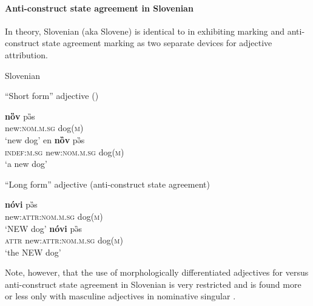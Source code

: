 \paragraph*{Anti\hyp{}construct state agreement in Slovenian}\label{slovenian synchr}
In theory, Slovenian (aka Slovene) is identical to  in exhibiting  marking and anti\hyp{}construct state agreement marking as two separate devices for adjective attribution.
\begin{exe}
\label{slov longshort}
\ex \rm{Slovenian \citep[410]{priestly1993}}
\begin{xlist}
\ex \rm{“Short form” adjective ()}
\begin{xlist}
\ex
\gll 	\textbf{nȍv} pə̏s\\
	new:\textsc{nom.m.sg} dog\textsc{(m)}\\
\glt	‘new dog’
\ex	
\gll	en \textbf{nȍv} pə̏s\\
	\textsc{indef:m.sg} new:\textsc{nom.m.sg} dog\textsc{(m)}\\
\glt	‘a new dog’
\end{xlist}
\ex \rm{“Long form” adjective (anti\hyp{}construct state agreement)}
\begin{xlist}
\ex	
\gll	\textbf{nóvi} pə̏s\\
	new:\textsc{attr:nom.m.sg} dog\textsc{(m)}\\
\glt	‘NEW dog’
\ex
{} \textbf{nóvi} pə̏s\\
	{\textsc{attr}} new:\textsc{attr:nom.m.sg} dog\textsc{(m)}\\
\glt	 ‘the NEW dog’
\end{xlist}
\end{xlist}
\end{exe}
Note, however, that the use of morphologically differentiated adjectives for  versus anti\hyp{}construct state agreement in Slovenian is very restricted and is found more or less only with masculine adjectives in nominative singular \citep[410–411]{priestly1993}.

